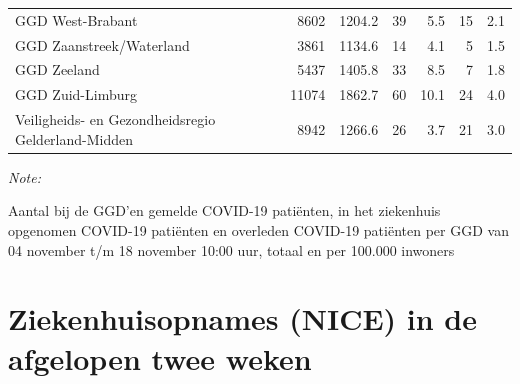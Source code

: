 \documentclass[
  english,
  man,floatsintext]{apa6}
\begin{document}
\begin{table}
\begin{threeparttable}
\begin{tabular}{lrrrrrr}
GGD West-Brabant & 8602 & 1204.2 & 39 & 5.5 & 15 & 2.1\\
GGD Zaanstreek/Waterland & 3861 & 1134.6 & 14 & 4.1 & 5 & 1.5\\
GGD Zeeland & 5437 & 1405.8 & 33 & 8.5 & 7 & 1.8\\
GGD Zuid-Limburg & 11074 & 1862.7 & 60 & 10.1 & 24 & 4.0\\
Veiligheids- en Gezondheidsregio Gelderland-Midden & 8942 & 1266.6 & 26 & 3.7 & 21 & 3.0\\
\bottomrule
\end{tabular}
\begin{tablenotes}
\item \textit{Note: } 
\item Aantal bij de GGD’en gemelde COVID-19 patiënten, in het ziekenhuis opgenomen COVID-19 patiënten en overleden COVID-19 patiënten per GGD van 04 november t/m 18 november 10:00 uur, totaal en per 100.000 inwoners
\end{tablenotes}
\end{threeparttable}
\endgroup{}
\end{table}

\newpage

\hypertarget{ziekenhuisopnames-nice-in-de-afgelopen-twee-weken}{%
\section{Ziekenhuisopnames (NICE) in de afgelopen twee weken}\label{ziekenhuisopnames-nice-in-de-afgelopen-twee-weken}}
\end{document}
